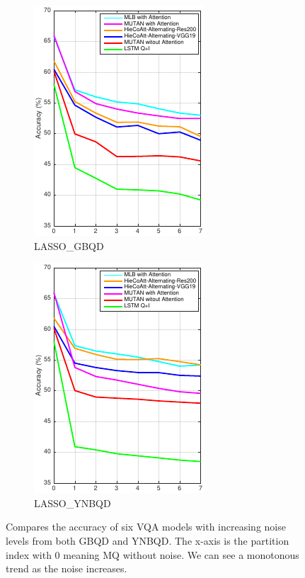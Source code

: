 \documentclass[letterpaper]{article}
\begin{document}
\begin{figure}
	\begin{subfigure}[t]{0.49\linewidth}
		\includegraphics{LASSO_GBQD}
		\caption{LASSO\_GBQD}
		\label{fig:lasso_gbqd}
	\end{subfigure}
	\hfill
	\begin{subfigure}[t]{0.49\linewidth}
		\includegraphics{LASSO_YNBQD}
		\caption{LASSO\_YNBQD}
		\label{fig:lasso_ynbqd}
	\end{subfigure}
	\caption{Compares the accuracy of six VQA models with increasing noise levels from both GBQD and YNBQD. The x-axis is the partition index with 0 meaning MQ without noise. We can see a monotonous trend as the noise increases.}
	\label{fig:lasso}
\end{figure}
\end{document}
